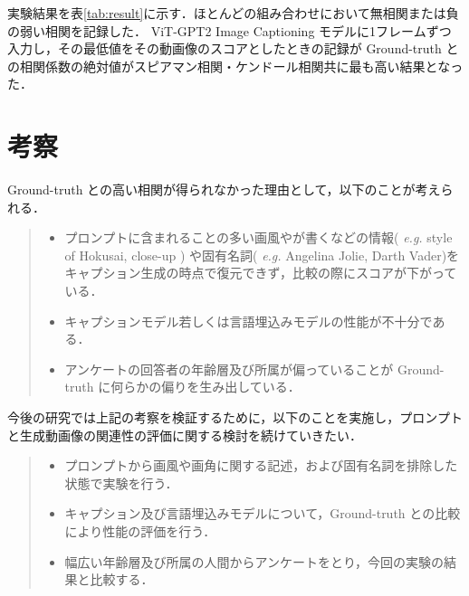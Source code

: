 \documentclass[10pt]{article}
\begin{document}
実験結果を表\ref{tab:result}に示す．ほとんどの組み合わせにおいて無相関または負の弱い相関を記録した． ViT-GPT2 Image Captioning モデルに1フレームずつ入力し，その最低値をその動画像のスコアとしたときの記録が Ground-truth との相関係数の絶対値がスピアマン相関・ケンドール相関共に最も高い結果となった．

\section{考察}

Ground-truth との高い相関が得られなかった理由として，以下のことが考えられる．

\begin{quote}\begin{itemize}
    \item プロンプトに含まれることの多い画風やが書くなどの情報( \textit{e.g.} style of Hokusai, close-up ) や固有名詞( \textit{e.g.} Angelina Jolie, Darth Vader)をキャプション生成の時点で復元できず，比較の際にスコアが下がっている．
    \item キャプションモデル若しくは言語埋込みモデルの性能が不十分である．
    \item アンケートの回答者の年齢層及び所属が偏っていることが Ground-truth に何らかの偏りを生み出している．
\end{itemize}\end{quote}

今後の研究では上記の考察を検証するために，以下のことを実施し，プロンプトと生成動画像の関連性の評価に関する検討を続けていきたい．

\begin{quote}\begin{itemize}
    \item プロンプトから画風や画角に関する記述，および固有名詞を排除した状態で実験を行う．
    \item キャプション及び言語埋込みモデルについて，Ground-truth との比較により性能の評価を行う．
    \item 幅広い年齢層及び所属の人間からアンケートをとり，今回の実験の結果と比較する．
\end{itemize}\end{quote}





\end{document}
